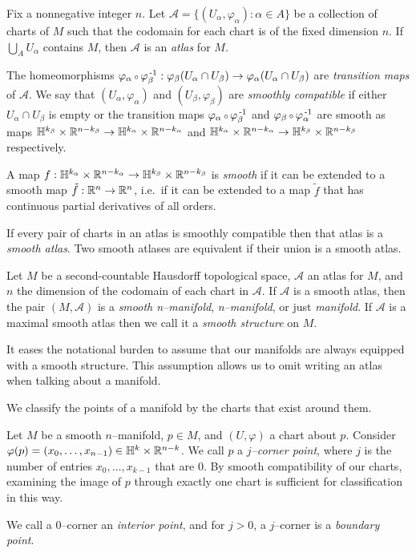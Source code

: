 \begin{defn}[Atlas]
	\label{def:atlas}
	Fix a nonnegative integer $n$.
	Let $\mathcal{A}=\{(U_\alpha,\varphi_\alpha):\alpha\in A\}$ be a collection of charts of $M$ such that the codomain for each chart is of the fixed dimension $n$.
	If $\bigcup_A U_\alpha$ contains $M$, then $\mathcal{A}$ is an \emph{atlas} for $M$.
	
	The homeomorphisms $\varphi_\alpha\comp \varphi_\beta\inv:\varphi_\beta(U_\alpha\cap U_\beta)\to \varphi_\alpha(U_\alpha\cap U_\beta)$ are \emph{transition maps} of $\mathcal{A}$.
	We say that $(U_\alpha,\varphi_\alpha)$ and $(U_\beta,\varphi_\beta)$ are \emph{smoothly compatible} if either $U_\alpha\cap U_\beta$ is empty or the transition maps $\varphi_\alpha\comp \varphi_\beta\inv$ and $\varphi_\beta\comp \varphi_\alpha\inv$ are smooth as maps $\mathbb{H}^{k_\beta}\times\mathbb{R}^{n-k_\beta}\to\mathbb{H}^{k_\alpha}\times\mathbb{R}^{n-k_\alpha}$ and  $\mathbb{H}^{k_\alpha}\times\mathbb{R}^{n-k_\alpha}\to\mathbb{H}^{k_\beta}\times\mathbb{R}^{n-k_\beta}$ respectively.
	
	A map $f:\mathbb{H}^{k_\alpha}\times\mathbb{R}^{n-k_\alpha}\to\mathbb{H}^{k_\beta}\times\mathbb{R}^{n-k_\beta}$ is \emph{smooth} if it can be extended to a smooth map $\tilde{f}:\mathbb{R}^n\to\mathbb{R}^n$, i.e.\ if it can be extended to a map $\tilde{f}$ that has continuous partial derivatives of all orders.
	
	If every pair of charts in an atlas is smoothly compatible then that atlas is a \emph{smooth atlas}.
	Two smooth atlases are equivalent if their union is a smooth atlas.
\end{defn}

\begin{defn}[Manifold]
	\label{def:manifold}
	Let $M$ be a second-countable Hausdorff topological space, $\mathcal{A}$ an atlas for $M$, and $n$ the dimension of the codomain of each chart in $\mathcal{A}$.
	If $\mathcal{A}$ is a smooth atlas, then the pair $(M,\mathcal{A})$ is a \emph{smooth n--manifold},  \emph{n--manifold}, or just \emph{manifold}.
	If $\mathcal{A}$ is a maximal smooth atlas then we call it a \emph{smooth structure} on $M$.
\end{defn}

It eases the notational burden to assume that our manifolds are always equipped with a smooth structure.
This assumption allows us to omit writing an atlas when talking about a manifold.

We classify the points of a manifold by the charts that exist around them.

\begin{defn}
	Let $M$ be a smooth $n$--manifold, $p\in M$, and $(U,\varphi)$ a chart about $p$.
	Consider $\varphi(p)=(x_0,\dots,x_{n-1})\in \mathbb{H}^k\times\mathbb{R}^{n-k}$.
	We call $p$ a \emph{$j$--corner point}, where $j$ is the number of entries $x_0,\dots,x_{k-1}$ that are 0.
	By smooth compatibility of our charts, examining the image of $p$ through exactly one chart is sufficient for classification in this way.
	
	We call a $0$--corner an \emph{interior point}, and for $j>0$, a $j$--corner is a \emph{boundary point}.	
\end{defn}
	
